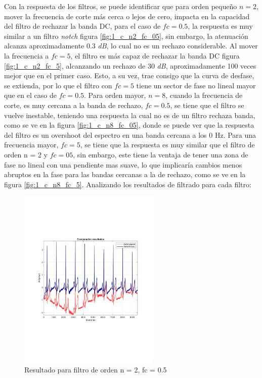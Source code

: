 		Con la respuesta de los filtros, se puede identificar que para orden pequeño $n = 2$, mover la frecuencia de corte más cerca o lejos de cero, impacta en la capacidad del filtro de rechazar la banda DC, para el caso de $fc = 0.5$, la respuesta es muy similar a un filtro \textit{notch} figura \ref{fig:1_c_n2_fc_05}, sin embargo, la atenuación alcanza aproximadamente 0.3 \textit{dB}, lo cual no es un rechazo considerable. Al mover la frecuencia a $fc = 5$, el filtro es más capaz de rechazar la banda DC figura \ref{fig:1_c_n2_fc_5}, alcanzando un rechazo de 30 \textit{dB}, aproximadamente 100 veces mejor que en el primer caso. Esto, a su vez, trae consigo que la curva de desfase, se extienda, por lo que el filtro con $fc = 5$ tiene un sector de fase no lineal mayor que en el caso de $fc = 0.5$. Para orden mayor, $n = 8$, cuando la frecuencia de corte, es muy cercana a la banda de rechazo, $fc = 0.5$, se tiene que el filtro se vuelve inestable, teniendo una respuesta la cual no es de un filtro rechaza banda, como se ve en la figura \ref{fig:1_c_n8_fc_05}, donde se puede ver que la respuesta del filtro es un overshoot del espectro en una banda cercana a los 0 Hz. Para una frecuencia mayor, $fc =5$, se tiene que la respuesta es muy similar que el filtro de orden n = 2 y $fc=05$, sin embargo, este tiene la ventaja de tener una zona de fase no lineal con una pendiente mas suave, lo que implicaría cambios menos abruptos en la fase para las bandas cercanas a la de rechazo, como se ve en la figura \ref{fig:1_c_n8_fc_5}. Analizando los resultados de filtrado para cada filtro:
		
		\begin{figure}[H]
			\center
			\includegraphics[width=0.6\textwidth,clip, trim = {1.9cm 6.8cm 2.3cm 7cm}]{../plots/1_c_ecg_filtered_2_freq_05.pdf}
			\caption{Resultado para filtro de orden n = 2, fc = 0.5}
			\label{fig:1_c_filter_n2_fc_05}
		\end{figure}
		
